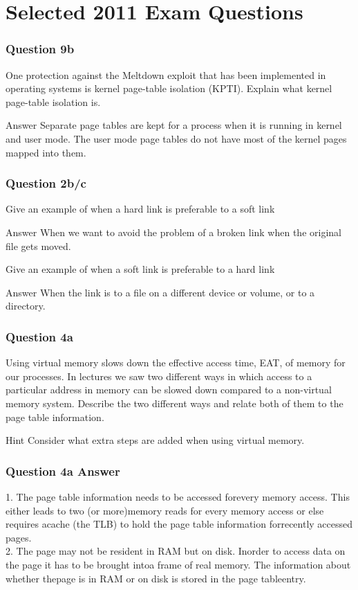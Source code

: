 \documentclass{beamer}
\begin{document}
\section{Selected 2011 Exam Questions}
\begin{frame}
  \frametitle{Question 9b}
  One protection against the Meltdown exploit that has been implemented in operating systems is kernel page-table isolation (KPTI). Explain what kernel page-table isolation is.
  \pause
  \begin{block}{Answer}
    Separate page tables are kept for a process when it is running in kernel and user mode. The user mode page tables do not have most of the kernel pages mapped into them.
  \end{block}
\end{frame}
\begin{frame}
  \frametitle{Question 2b/c}
  Give an example of when a hard link is preferable to a soft link
  \pause
  \begin{block}{Answer}
    When we want to avoid the problem of a broken link when the original file gets moved.
  \end{block}
  \pause
  Give an example of when a soft link is preferable to a hard link
  \pause
  \begin{block}{Answer}
    When the link is to a file on a different device or volume, or to a directory.
  \end{block}
\end{frame}
\begin{frame}
  \frametitle{Question 4a}
  Using virtual memory slows down the effective access time, EAT, of memory for our processes. In lectures we saw two different ways in which access to a particular address in  memory can be slowed down compared to a non-virtual memory system. Describe the two different ways and relate both of them to the page table information.
  \begin{block}{Hint}
    Consider what extra steps are added when using virtual memory.
  \end{block}
\end{frame}
\begin{frame}
  \frametitle{Question 4a Answer}
  1. The page table information needs to be accessed forevery memory access. This either leads to two (or more)memory reads for every memory access or else requires acache (the TLB) to hold the page table information forrecently accessed pages. \\
  2. The page may not be resident in RAM but on disk. Inorder to access data on the page it has to be brought intoa frame of real memory. The information about whether thepage is in RAM or on disk is stored in the page tableentry.
\end{frame}
\end{document}
